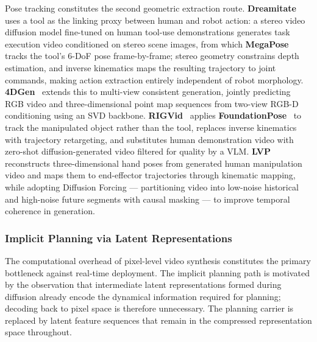 Pose tracking constitutes the second geometric extraction route. \textbf{Dreamitate}~\cite{liang2024dreamitate} uses a tool as the linking proxy between human and robot action: a stereo video diffusion model fine-tuned on human tool-use demonstrations generates task execution video conditioned on stereo scene images, from which \textbf{MegaPose}~\cite{labbe2022megapose} tracks the tool's 6-DoF pose frame-by-frame; stereo geometry constrains depth estimation, and inverse kinematics maps the resulting trajectory to joint commands, making action extraction entirely independent of robot morphology. \textbf{4DGen}~\cite{liu2025fourdgen} extends this to multi-view consistent generation, jointly predicting RGB video and three-dimensional point map sequences from two-view RGB-D conditioning using an SVD backbone. \textbf{RIGVid}~\cite{patel2025rigvid} applies \textbf{FoundationPose}~\cite{wen2024foundationpose} to track the manipulated object rather than the tool, replaces inverse kinematics with trajectory retargeting, and substitutes human demonstration video with zero-shot diffusion-generated video filtered for quality by a VLM. \textbf{LVP}~\cite{chen2025lvp} reconstructs three-dimensional hand poses from generated human manipulation video and maps them to end-effector trajectories through kinematic mapping, while adopting Diffusion Forcing — partitioning video into low-noise historical and high-noise future segments with causal masking — to improve temporal coherence in generation.

\subsubsection{Implicit Planning via Latent Representations}

\label{sec:cacaded_wam_implicit}

The computational overhead of pixel-level video synthesis constitutes the primary bottleneck against real-time deployment. The implicit planning path is motivated by the observation that intermediate latent representations formed during diffusion already encode the dynamical information required for planning; decoding back to pixel space is therefore unnecessary. The planning carrier is replaced by latent feature sequences that remain in the compressed representation space throughout.

